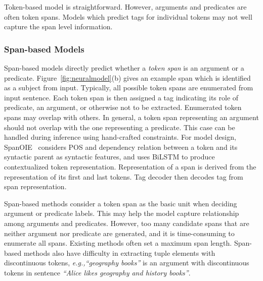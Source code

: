 \documentclass{article}
\newcommand{\eg}{\emph{e.g.,}\xspace}
\begin{document}
Token-based model is straightforward. However, arguments and predicates are often token spans. Models which predict tags for individual tokens may not well capture the span level information.

\subsubsection{Span-based Models}
Span-based models directly predict whether a \textit{token span} is an argument or a predicate.
Figure~\ref{fig:neuralmodel}(b) gives an example span  which is identified as a subject from input.
Typically, all possible token spans are enumerated from input sentence. Each token span is then assigned a tag indicating its role of predicate, an argument, or otherwise not to be extracted. Enumerated token spans may overlap with others. In general, a token span representing an argument should not overlap with the one representing a predicate. This case can be handled during inference using hand-crafted constraints. 
For model design, SpanOIE~\cite{zhanandzhao-2020-span} considers POS and dependency relation between a token and its syntactic parent as syntactic features, and uses BiLSTM to produce contextualized token representation. Representation of a span is derived from the representation of its first and last tokens. Tag decoder then decodes tag from span representation.

Span-based methods consider a token span as the basic unit when deciding argument or predicate labels. This may help the model capture relationship among arguments and predicates. However, too many candidate spans that are neither argument nor predicate are generated, and it is time-consuming to enumerate all spans. Existing methods often set a maximum span length. Span-based methods also have difficulty in extracting tuple elements with discontinuous tokens, \eg \textit{``geography books''} is an argument with discontinuous tokens in sentence \textit{``Alice likes geography and history books''}. 
\end{document}
